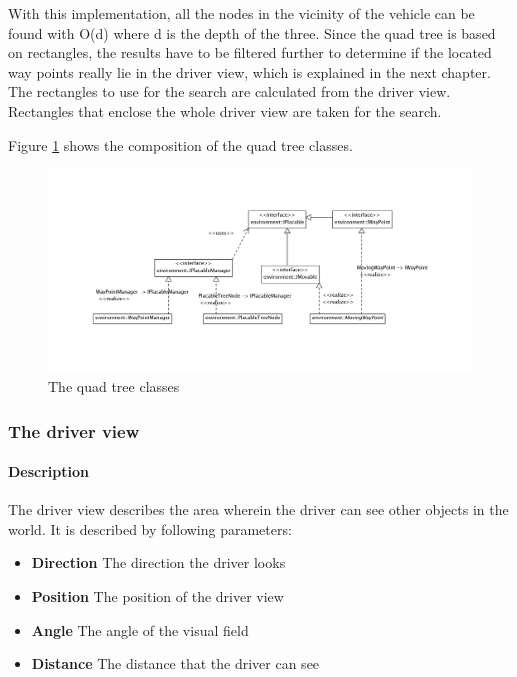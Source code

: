 \noindent With this implementation, all the nodes in the vicinity of the
vehicle can be found with O(d) where d is the depth of the three. Since
the quad tree is based on rectangles, the results have to be filtered
further to determine if the located way points really lie in the driver
view, which is explained in the next chapter.\\

\noindent The rectangles to use for the search are calculated from the
driver view. Rectangles that enclose the whole driver view are taken
for the search.

\noindent Figure \ref{fig:quadTreeClasses} shows the composition of the
quad tree classes.

\begin{figure}[H]
\begin{center}
\includegraphics[width=\textwidth]{images/waypointsmanager.png}
\end{center}
\caption{The quad tree classes}
\label{fig:quadTreeClasses}
\end{figure}

\subsubsection{The driver view}
\label{sec:driverView}

\paragraph{Description}

The driver view describes the area wherein the driver can see other objects in
the world. It is described by following parameters:

\begin{itemize}
\item \textbf{Direction} The direction the driver looks
\item \textbf{Position} The position of the driver view 
\item \textbf{Angle} The angle of the visual field
\item \textbf{Distance} The distance that the driver can see
\end{itemize}

